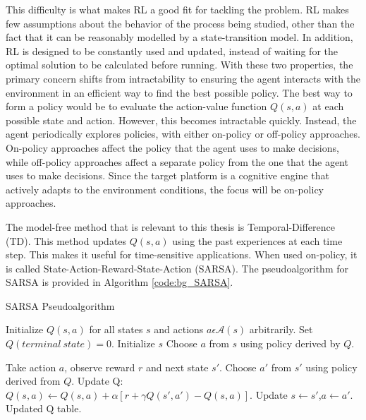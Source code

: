	\par This difficulty is what makes RL a good fit for tackling the problem. RL makes few assumptions about the behavior of the process being studied, other than the fact that it can be reasonably modelled by a state-transition model. In addition, RL is designed to be constantly used and updated, instead of waiting for the optimal solution to be calculated before running. With these two properties, the primary concern shifts from intractability to ensuring the agent interacts with the environment in an efficient way to find the best possible policy. The best way to form a policy would be to evaluate the action-value function $Q(s,a)$ at each possible state and action. However, this becomes intractable quickly. Instead, the agent periodically explores policies, with either on-policy or off-policy approaches. On-policy approaches affect the policy that the agent uses to make decisions, while off-policy approaches affect a separate policy from the one that the agent uses to make decisions. Since the target platform is a cognitive engine that actively adapts to the environment conditions, the focus will be on-policy approaches. 
	\par The model-free method that is relevant to this thesis is Temporal-Difference (TD). This method updates $Q(s,a)$ using the past experiences at each time step. This makes it useful for time-sensitive applications. When used on-policy, it is called State-Action-Reward-State-Action (SARSA). The pseudoalgorithm for SARSA is provided in Algorithm \ref{code:bg_SARSA}.
	
	\begin{algorithm}[ht]
	\caption{SARSA Pseudoalgorithm}
	\label{code:bg_SARSA}
	\begin{algorithmic}[1]
		\State Initialize $Q(s,a)$ for all states $s$ and actions $a \epsilon \mathcal{A}(s)$ arbitrarily. Set $Q(terminal\ state)=0$.
		\State Initialize $s$
		\State Choose $a$ from $s$ using policy derived by $Q$.
		
		\State Take action $a$, observe reward $r$ and next state $s'$.
		\State Choose $a'$ from $s'$ using policy derived from $Q$.
		\State Update Q: $Q(s,a) \gets Q(s,a) + \alpha[r + \gamma Q(s',a')-Q(s,a)]$.
		\State Update $s \gets s'$,$a \gets a'$.
		\EndWhile
		\EndWhile
		\State \Return Updated Q table.
		\EndProcedure
	\end{algorithmic}
\end{algorithm}


